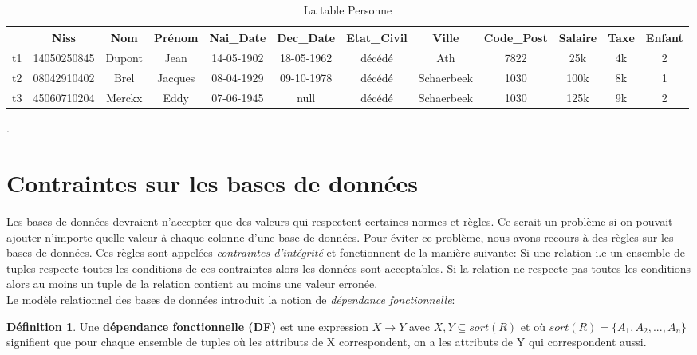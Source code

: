 \documentclass[letterpaper, 12pt]{report}
\theoremstyle{definition}
\newtheorem{mydef}{Définition}
\newcommand{\alinea}{
\hspace*{0.5cm}}
\begin{document}
\begin{table}[H]
 \footnotesize	
	\centering
	\hspace*{-2cm}\begin{tabular}{|c|c c c c c c c c c c c|}
	\hline
	    & Niss & Nom & Prénom & Nai\_Date & Dec\_Date & Etat\_Civil & Ville & Code\_Post & Salaire & Taxe & Enfant\\
	\hline
	 t1 & 14050250845 & Dupont & Jean & 14-05-1902 & 18-05-1962 & décédé & Ath & 7822 & 25k & 4k & 2\\
	 t2 & 08042910402 & Brel & Jacques & 08-04-1929 & 09-10-1978 & décédé & Schaerbeek & 1030 & 100k & 8k & 1\\
	 t3 & 45060710204 & Merckx & Eddy & 07-06-1945 & null & décédé & Schaerbeek & 1030 & 125k & 9k & 2\\
	\hline
	 
	 \hline
	\end{tabular}
	\caption{\label{tablePerson} La table Personne}.
\end{table}


\newpage

\section{Contraintes sur les bases de données}

\alinea Les bases de données devraient n'accepter que des valeurs qui respectent certaines normes et règles. Ce serait un problème si on pouvait ajouter n'importe quelle valeur à chaque colonne d'une base de données. Pour éviter ce problème, nous avons recours à des règles sur les bases de données. Ces règles sont appelées \emph{contraintes d'intégrité} et fonctionnent de la manière suivante: Si une relation i.e un ensemble de tuples respecte toutes les conditions de ces contraintes alors les données sont acceptables. Si la relation ne respecte pas toutes les conditions alors au moins un tuple de la relation contient au moins  une valeur erronée. \\

Le modèle relationnel des bases de données introduit la notion de \emph{dépendance fonctionnelle}:

\begin{mydef}
Une \textbf{dépendance fonctionnelle (DF)} est une expression $X \rightarrow Y$ avec $X,Y \subseteq
sort(R)$ et où $sort(R) = \{ A_1,A_2,...,A_n\}$ signifient que pour chaque ensemble de tuples où les attributs de X correspondent, on a les attributs de Y qui correspondent aussi.
\end{mydef} 
\end{document}
